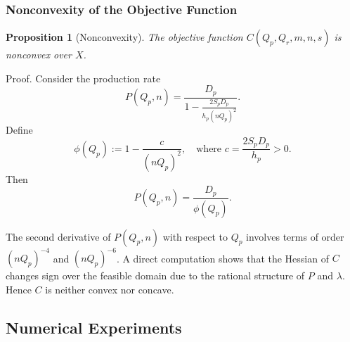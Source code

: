 \documentclass[11pt]{article}
\newtheorem{proposition}{Proposition}[section]
\newcommand{\proofbox}{\hspace{\fill}{$\Box$}}
\newenvironment{proof}{Proof.}{\proofbox}
\begin{document}
\subsubsection*{Nonconvexity of the Objective Function}

\begin{proposition}[Nonconvexity]
The objective function $C(Q_p,Q_r,m,n,s)$ is nonconvex over $X$.
\end{proposition}

\begin{proof}
Consider the production rate
\[
P(Q_p,n)
= \frac{D_p}{1 - \frac{2S_pD_p}{h_p(nQ_p)^2}}.
\]
Define
\[
\phi(Q_p) := 1 - \frac{c}{(nQ_p)^2},
\quad \text{where } c=\frac{2S_pD_p}{h_p}>0.
\]
Then
\[
P(Q_p,n) = \frac{D_p}{\phi(Q_p)}.
\]

\noindent The second derivative of $P(Q_p,n)$ with respect to $Q_p$
involves terms of order $(nQ_p)^{-4}$ and $(nQ_p)^{-6}$.
A direct computation shows that the Hessian of $C$
changes sign over the feasible domain due to the rational
structure of $P$ and $\lambda$. Hence $C$ is neither convex nor concave.
\end{proof}









\subsection{Numerical Experiments}\label{Moo}
\end{document}

